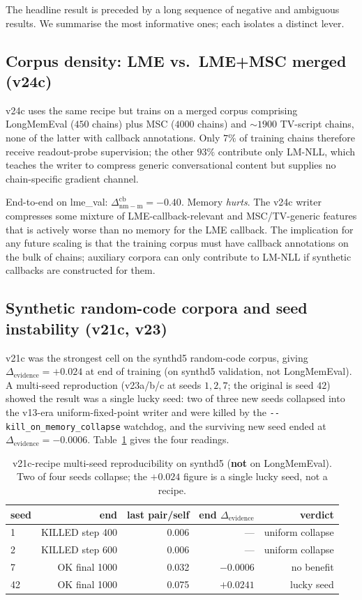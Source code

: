 \documentclass[11pt]{article}
\newcommand{\dnm}{\Delta_{\mathrm{nm{-}m}}}
\newcommand{\elift}{\Delta_{\mathrm{evidence}}}
\begin{document}
The headline result is preceded by a long sequence of negative and
ambiguous results. We summarise the most informative ones; each
isolates a distinct lever.

\subsection{Corpus density: LME vs.\ LME+MSC merged (v24c)}

v24c uses the same recipe but trains on a merged corpus comprising
LongMemEval ($450$ chains) plus MSC ($4000$ chains) and $\sim 1900$
TV-script chains, none of the latter with callback annotations. Only $7\%$ of training
chains therefore receive readout-probe supervision; the other $93\%$
contribute only LM-NLL, which teaches the writer to compress
generic conversational content but supplies no chain-specific
gradient channel.

End-to-end on lme\_val: $\dnm^{\mathrm{cb}} = -0.40$. Memory
\emph{hurts}. The v24c writer compresses some mixture of
LME-callback-relevant and MSC/TV-generic features that is actively
worse than no memory for the LME callback. The implication for any
future scaling is that the training corpus must have callback
annotations on the bulk of chains; auxiliary corpora can only
contribute to LM-NLL if synthetic callbacks are constructed for them.

\subsection{Synthetic random-code corpora and seed instability (v21c, v23)}

v21c was the strongest cell on the synthd5 random-code corpus,
giving $\elift = +0.024$ at end of training (on synthd5 validation,
not LongMemEval). A multi-seed reproduction (v23a/b/c at seeds $1,2,7$;
the original is seed $42$) showed the result was a single lucky seed:
two of three new seeds collapsed into the v13-era uniform-fixed-point
writer and were killed by the
\texttt{-{}-kill\_on\_memory\_collapse} watchdog, and the surviving
new seed ended at $\elift = -0.0006$. Table~\ref{tab:v23_seeds}
gives the four readings.

\begin{table}[h]
\centering
\small
\caption{v21c-recipe multi-seed reproducibility on synthd5
(\textbf{not} on LongMemEval). Two of four seeds collapse; the
$+0.024$ figure is a single lucky seed, not a recipe.}
\label{tab:v23_seeds}
\begin{tabular}{lrrrr}
\toprule
seed & end & last pair/self & end $\elift$ & verdict \\
\midrule
1  & KILLED step 400 & 0.006 & --- & uniform collapse \\
2  & KILLED step 600 & 0.006 & --- & uniform collapse \\
7  & OK final 1000 & 0.032 & $-0.0006$ & no benefit \\
42 & OK final 1000 & 0.075 & $+0.0241$ & lucky seed \\
\bottomrule
\end{tabular}
\end{table}
\end{document}
